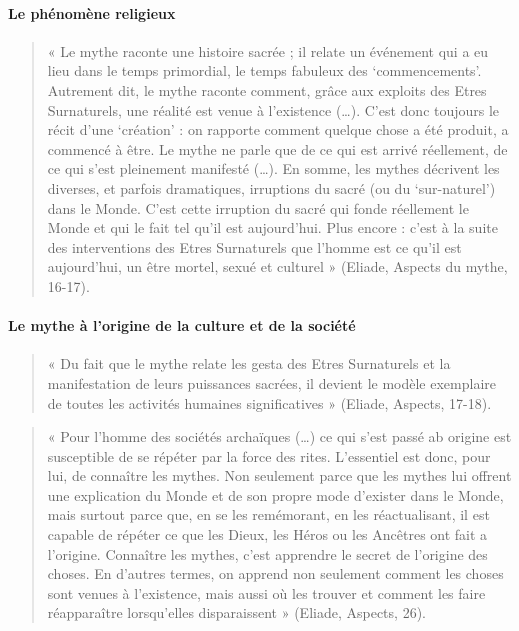 \paragraph{Le phénomène religieux }

\begin{quote}
    « Le mythe raconte une histoire sacrée ; il relate un événement qui a eu lieu dans le temps primordial, le temps fabuleux des ‘commencements’. Autrement dit, le mythe raconte comment, grâce aux exploits des Etres Surnaturels, une réalité est venue à l’existence (…). C’est donc toujours le récit d’une ‘création’ : on rapporte comment quelque chose a été produit, a commencé à être. Le mythe ne parle que de ce qui est arrivé réellement, de ce qui s’est pleinement manifesté (…). En somme, les mythes décrivent les diverses, et parfois dramatiques, irruptions du sacré (ou du ‘sur-naturel’) dans le Monde. C’est cette irruption du sacré qui fonde réellement le Monde et qui le fait tel qu’il est aujourd’hui. Plus encore : c’est à la suite des interventions des Etres Surnaturels que l’homme est ce qu’il est aujourd’hui, un être mortel, sexué et culturel » (Eliade, Aspects du mythe, 16-17). 
\end{quote}

\paragraph{Le mythe à l’origine de la culture et de la société }

\begin{quote}
    « Du fait que le mythe relate les gesta des Etres Surnaturels et la manifestation de leurs puissances sacrées, il devient le modèle exemplaire de toutes les activités humaines significatives » (Eliade, Aspects, 17-18).  
\end{quote}

\begin{quote}
    « Pour l’homme des sociétés archaïques (…) ce qui s’est passé ab origine est susceptible de se répéter par la force des rites. L’essentiel est donc, pour lui, de connaître les mythes. Non seulement parce que les mythes lui offrent une explication du Monde et de son propre mode d’exister dans le Monde, mais surtout parce que, en se les remémorant, en les réactualisant, il est capable de répéter ce que les Dieux, les Héros ou les Ancêtres ont fait a l'origine. Connaître les mythes, c’est apprendre le secret de l’origine des choses. En d’autres termes, on apprend non seulement comment les choses sont venues à l’existence, mais aussi où les trouver et comment les faire réapparaître lorsqu’elles disparaissent » (Eliade, Aspects, 26). 
\end{quote}

